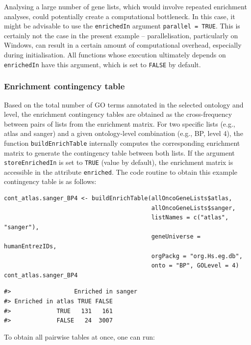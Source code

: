 Analysing a large number of gene lists, which would involve repeated enrichment analyses, could potentially create a computational bottleneck. In this case, it might be advisable to use the \texttt{enrichedIn} argument \texttt{parallel\ =\ TRUE}. This is certainly not the case in the present example -- parallelisation, particularly on Windows, can result in a certain amount of computational overhead, especially during initialisation. All functions whose execution ultimately depends on \texttt{enrichedIn} have this argument, which is set to \texttt{FALSE} by default.

\subsubsection{Enrichment contingency table}\label{enrichment-contingency-table}

Based on the total number of GO terms annotated in the selected ontology and level, the enrichment contingency tables are obtained as the cross-frequency between pairs of lists from the enrichment matrix. For two specific lists (e.g., atlas and sanger) and a given ontology-level combination (e.g., BP, level 4), the function \texttt{buildEnrichTable} internally computes the corresponding enrichment matrix to generate the contingency table between both lists. If the argument \texttt{storeEnrichedIn} is set to \texttt{TRUE} (value by default), the enrichment matrix is accessible in the attribute \texttt{enriched}. The code routine to obtain this example contingency table is as follows:

\begin{verbatim}
cont_atlas.sanger_BP4 <- buildEnrichTable(allOncoGeneLists$atlas, 
                                          allOncoGeneLists$sanger,
                                          listNames = c("atlas", "sanger"),
                                          geneUniverse = humanEntrezIDs, 
                                          orgPackg = "org.Hs.eg.db", 
                                          onto = "BP", GOLevel = 4)
cont_atlas.sanger_BP4
\end{verbatim}

\begin{verbatim}
#>                  Enriched in sanger
#> Enriched in atlas TRUE FALSE
#>             TRUE   131   161
#>             FALSE   24  3007
\end{verbatim}

To obtain all pairwise tables at once, one can run:

